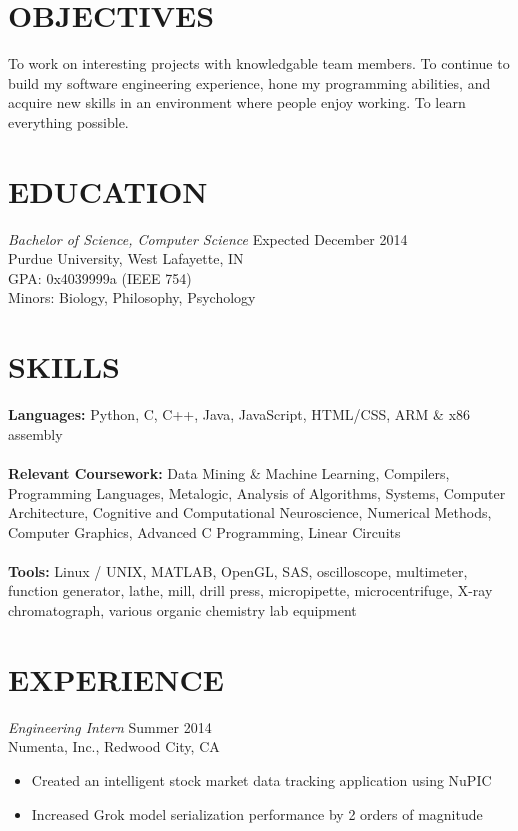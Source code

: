 \documentclass[margin,5pt]{res} %
\begin{document}
\address{vsinha@purdue.edu\\ vsinha.com \\github.com/vsinha}
\address{217 Pierce St. Unit 2 \\ West Lafayette, IN 47906\\(408) 505-1275}


\begin{resume}

 
\section{OBJECTIVES}To work on interesting projects with knowledgable team members. To continue to build
my software engineering experience, hone my programming abilities, and acquire new skills
in an environment where people enjoy working. To learn everything possible.

 

\section{EDUCATION} {\sl Bachelor of Science, Computer Science }\hfill Expected December 2014\\
               	 	    Purdue University, West Lafayette, IN\\
			    GPA: 0x4039999a (IEEE 754) \\
                            Minors: Biology, Philosophy,  Psychology 
 

\section{SKILLS} {\bf Languages:} Python, C, C++, Java, JavaScript, HTML/CSS, ARM \& x86 assembly\\ \\
 		      {\bf Relevant Coursework:} Data Mining \& Machine Learning, Compilers, Programming Languages, Metalogic, Analysis of Algorithms, 
							Systems, Computer Architecture, Cognitive and Computational Neuroscience,
							Numerical Methods, Computer Graphics, Advanced C Programming, Linear Circuits\\ \\
		      {\bf Tools:} Linux / UNIX, MATLAB, OpenGL, SAS, oscilloscope, multimeter, function generator, lathe, mill, drill press, 
					micropipette, microcentrifuge, X-ray chromatograph, various organic chemistry lab equipment
 

\section{EXPERIENCE} {\sl Engineering Intern} \hfill Summer 2014\\
               Numenta, Inc., Redwood City, CA
                \begin{itemize} \itemsep -2pt
                \item Created an intelligent stock market data tracking application using NuPIC
                \item Increased Grok model serialization performance by 2 orders of magnitude
	       \end{itemize}



\end{resume}
\end{document}
